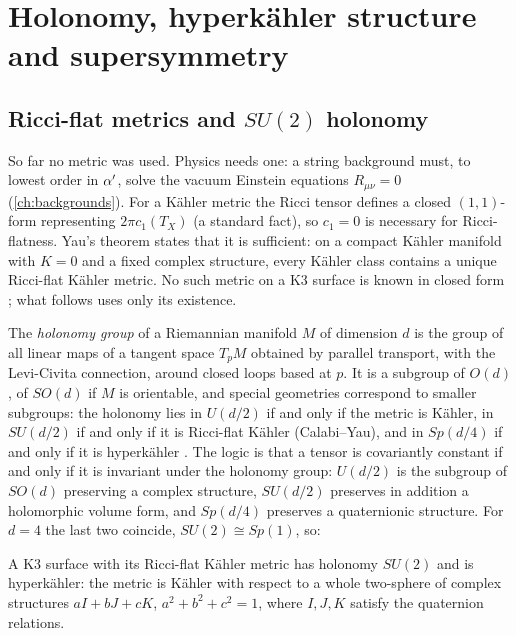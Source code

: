 \section{Holonomy, hyperkähler structure and supersymmetry}\label{sec:k3:holonomy}

\subsection{Ricci-flat metrics and \texorpdfstring{$SU(2)$}{SU(2)} holonomy}

So far no metric was used. Physics needs one: a string background must, to lowest order in
$\alpha'$, solve the vacuum Einstein equations $R_{\mu\nu}=0$ (\cref{ch:backgrounds}). For a
Kähler metric the Ricci tensor defines a closed $(1,1)$-form representing $2\pi c_1(T_X)$
(a standard fact), so $c_1=0$ is necessary for Ricci-flatness. Yau's theorem states that it is
sufficient: on a compact Kähler manifold with $K=0$ and a fixed complex structure, every Kähler
class contains a unique Ricci-flat Kähler metric. \TL{}  No such
metric on a K3 surface is known in closed form ; what follows
uses only its existence.

The \emph{holonomy group} of a Riemannian manifold $M$ of dimension $d$ is the
group of all linear maps of a tangent space $T_pM$ obtained by parallel transport, with the
Levi-Civita connection, around closed loops based at $p$. It is a subgroup of $O(d)$, of
$SO(d)$ if $M$ is orientable, and special geometries correspond to smaller subgroups: the
holonomy lies in $U(d/2)$ if and only if the metric is Kähler, in $SU(d/2)$ if and only if it is
Ricci-flat Kähler (Calabi--Yau), and in $Sp(d/4)$ if and only if it is hyperkähler
. The logic is that a tensor is covariantly constant if and only
if it is invariant under the holonomy group: $U(d/2)$ is the subgroup of $SO(d)$ preserving a
complex structure, $SU(d/2)$ preserves in addition a holomorphic volume form, and $Sp(d/4)$
preserves a quaternionic structure. For $d=4$ the last two coincide, $SU(2)\cong Sp(1)$, so:

\begin{proposition}\label{prop:k3:hyperkahler}
A K3 surface with its Ricci-flat Kähler metric has holonomy $SU(2)$ and is
hyperkähler: the metric is Kähler with respect to a whole
two-sphere of complex structures $aI+bJ+cK$, $a^2+b^2+c^2=1$, where $I,J,K$ satisfy the
quaternion relations. \TL{} 
\end{proposition}

